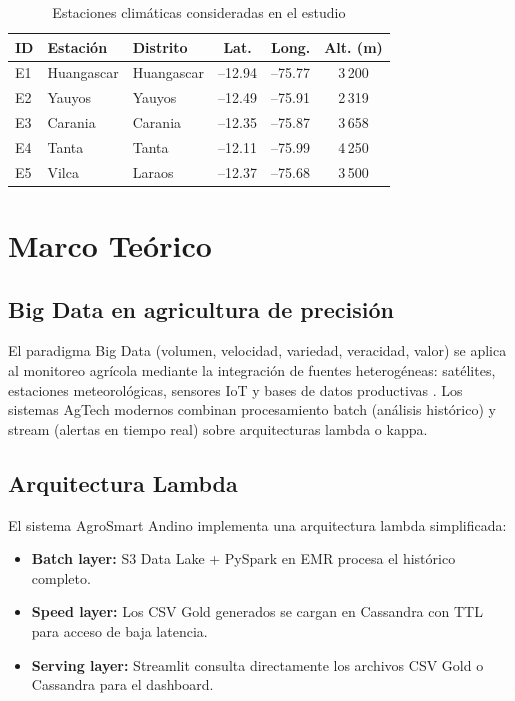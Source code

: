 \documentclass[12pt,a4paper]{article}
\begin{document}
\begin{table}[H]
\centering
\caption{Estaciones climáticas consideradas en el estudio}
\label{tab:estaciones}
\begin{tabular}{lllccc}
\toprule
\textbf{ID} & \textbf{Estación} & \textbf{Distrito} & \textbf{Lat.} & \textbf{Long.} & \textbf{Alt. (m)} \\
\midrule
E1 & Huangascar & Huangascar & --12.94 & --75.77 & 3\,200 \\
E2 & Yauyos     & Yauyos     & --12.49 & --75.91 & 2\,319 \\
E3 & Carania    & Carania    & --12.35 & --75.87 & 3\,658 \\
E4 & Tanta      & Tanta      & --12.11 & --75.99 & 4\,250 \\
E5 & Vilca      & Laraos     & --12.37 & --75.68 & 3\,500 \\
\bottomrule
\end{tabular}
\end{table}

\section{Marco Teórico}

\subsection{Big Data en agricultura de precisión}

El paradigma Big Data (volumen, velocidad, variedad, veracidad, valor) se
aplica al monitoreo agrícola mediante la integración de fuentes
heterogéneas: satélites, estaciones meteorológicas, sensores IoT y bases
de datos productivas \cite{kamilaris2017}. Los sistemas AgTech modernos
combinan procesamiento batch (análisis histórico) y stream (alertas en
tiempo real) sobre arquitecturas lambda o kappa.

\subsection{Arquitectura Lambda}

El sistema AgroSmart Andino implementa una arquitectura lambda
simplificada:
\begin{itemize}[noitemsep]
  \item \textbf{Batch layer:} S3 Data Lake + PySpark en EMR procesa el
    histórico completo.
  \item \textbf{Speed layer:} Los CSV Gold generados se cargan en Cassandra
    con TTL para acceso de baja latencia.
  \item \textbf{Serving layer:} Streamlit consulta directamente los archivos
    CSV Gold o Cassandra para el dashboard.
\end{itemize}
\end{document}
